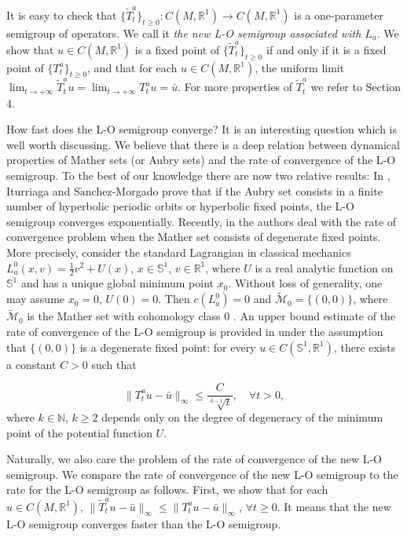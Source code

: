 \documentclass{amsart}[12pt]
\theoremstyle{definition}
\theoremstyle{remark}
\numberwithin{equation}{section}
\begin{document}
It is easy to check that $\{\tilde{T}^a_t\}_{t\geq
0}:C(M,\mathbb{R}^1)\to C(M,\mathbb{R}^1)$ is a one-parameter
semigroup of operators. We call it {\em the new L-O semigroup
associated with $L_a$}. We show that $u\in C(M,\mathbb{R}^1)$ is a
fixed point of $\{\tilde{T}^a_t\}_{t\geq 0}$ if and only if it is
a fixed point of $\{T^a_t\}_{t\geq 0}$, and that for each $u\in
C(M,\mathbb{R}^1)$, the uniform limit
$\lim_{t\to+\infty}\tilde{T}^a_tu=\lim_{t\to+\infty}T^a_tu=\bar{u}$.
For more properties of $\tilde{T}^a_t$ we refer to Section 4.

How fast does the L-O semigroup converge? It is an interesting
question which is well worth discussing. We believe that there is
a deep relation between dynamical properties of Mather sets (or
Aubry sets) and the rate of convergence of the L-O semigroup. To
the best of our knowledge there are now two relative results: In
\cite{Itu}, Iturriaga and S$\mathrm{\acute{a}}$nchez-Morgado prove
that if the Aubry set consists in a finite number of hyperbolic
periodic orbits or hyperbolic fixed points, the L-O semigroup
converges exponentially. Recently, in \cite{Wan} the authors deal
with the rate of convergence problem when the Mather set consists
of degenerate fixed points. More precisely, consider the standard
Lagrangian in classical mechanics
$L^0_a(x,v)=\frac{1}{2}v^2+U(x)$, $x\in \mathbb{S}^1$, $v\in
\mathbb{R}^1$, where $U$ is a real analytic function on
$\mathbb{S}^1$ and has a unique global minimum point $x_0$.
Without loss of generality, one may assume $x_0=0$, $U(0)=0$. Then
$c(L^0_a)=0$ and $\tilde{\mathcal{M}}_0=\{(0,0)\}$, where
$\tilde{\mathcal{M}}_0$ is the Mather set with cohomology class 0
\cite{Mat91}. An upper bound estimate of the rate of convergence
of the L-O semigroup is provided in \cite{Wan} under the
assumption that $\{(0,0)\}$ is a degenerate fixed point: for every
$u\in C(\mathbb{S}^1,\mathbb{R}^1)$, there exists a constant $C>0$
such that

\[
\|T^a_tu-\bar{u}\|_\infty\leq\frac{C}{\sqrt[k-1]{t}}, \quad
\forall t>0,
\]
where $k\in \mathbb{N}$, $k\geq 2$ depends only on the degree of
degeneracy of the minimum point of the potential function $U$.

Naturally, we also care the problem of the rate of convergence of
the new L-O semigroup. We compare the rate of convergence of the
new L-O semigroup to the rate for the L-O semigroup as follows.
First, we show that for each $u\in C(M,\mathbb{R}^1)$,
$\|\tilde{T}^a_tu-\bar{u}\|_\infty\leq\|T^a_tu-\bar{u}\|_\infty$,
$\forall t\geq 0$. It means that the new L-O semigroup converges
faster than the L-O semigroup.
\end{document}
